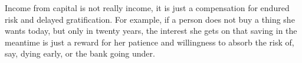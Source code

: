 Income from capital is not really income, it is just a compensation for endured risk and delayed gratification. For example, if a person does not buy a thing she wants today, but only in twenty years, the interest she gets on that saving in the meantime is just a reward for her patience and willingness to absorb the risk of, say, dying early, or the bank going under.

